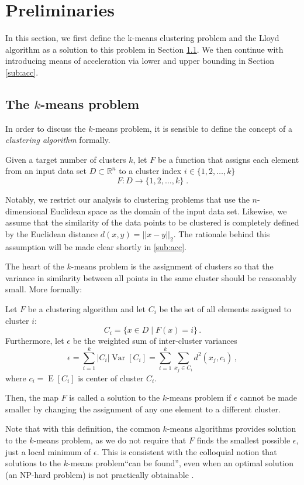 \newcommand{\kmeans}{$k$-means problem\xspace}

\section{Preliminaries}\label{Preliminaries}

In this section, we first define the k-means clustering problem and the Lloyd algorithm as a solution to this problem in Section \ref{subsec: kmeans}.
We then continue with introducing means of acceleration via lower and upper bounding in Section \ref{sub:acc}.


\subsection{The \kmeans} \label{subsec: kmeans}

In order to discuss the \kmeans, it is sensible to define the concept of a \emph{clustering algorithm} formally.
\begin{definition}
	Given a target number of clusters $k$,
	let $F$ be a function that assigns each element from an input data set $D\subset \mathbb{R}^n$ to a
	cluster index $i \in \{1, 2, \ldots, k\}$
	$$ F:D \to \{1, 2, \ldots, k\} \;.$$
\end{definition}
Notably, we restrict our analysis to clustering problems that use the $n$-dimensional Euclidean space as the domain of the input data set.
Likewise, we assume that the similarity of the data points to be clustered is completely defined by the Euclidean distance $d(x,y)= || x-y ||_2 $.
The rationale behind this assumption will be made clear shortly in \autoref{sub:acc}.

The heart of the \kmeans is the assignment of clusters so that the variance in similarity between all points in the same cluster should be reasonably small.
More formally:
\begin{definition}[\kmeans]
	Let $F$ be a clustering algorithm
	and let $C_i$ be the set of all elements assigned to cluster $i$:
	$$ C_i = \{x \in D \mid F(x) = i\} \,.$$
	Furthermore, let $\epsilon$ be the weighted sum of inter-cluster variances
	$$ \epsilon = \sum_{i=1}^k |C_i| \operatorname{Var}[C_i] = \sum_{i=1}^k \sum_{x_j \in C_i}  d^2(x_j, c_i)\,, $$
	where $c_i = \operatorname{E}[C_i]$ is center of cluster $C_i$.

	Then, the map $F$ is called a solution to the \kmeans
	if $\epsilon$ cannot be made smaller by changing the assignment of any one element to a different cluster.
\end{definition}
Note that with this definition, the common $k$-means algorithms provides solution to the \kmeans,
as we do not require that $F$ finds the smallest possible $\epsilon$,
just a local minimum of $\epsilon$.
This is consistent with the colloquial notion that solutions to the \kmeans ``can be found'',
even when an optimal solution (an NP-hard problem) is not practically obtainable \cite{han2012data}.

